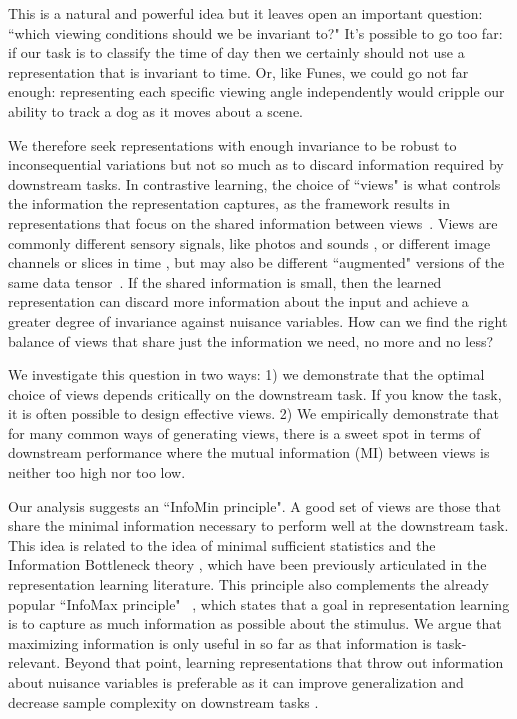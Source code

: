 \documentclass{article}
\begin{document}
This is a natural and powerful idea but it leaves open an important question: ``which viewing conditions should we be invariant to?" It's possible to go too far: if our task is to classify the time of day then we certainly should not use a representation that is invariant to time. Or, like Funes, we could go not far enough: representing each specific viewing angle independently would cripple our ability to track a dog as it moves about a scene. 

We therefore seek representations with enough invariance to be robust to inconsequential variations but not so much as to discard information required by downstream tasks. 
In contrastive learning, the choice of ``views" is what controls the information the representation captures, as the framework results in representations that focus on the shared information between views~\cite{oord2018representation}. Views are commonly different sensory signals, like photos and sounds \cite{arandjelovic2018objects}, or different image channels \cite{tian2019contrastive} or slices in time \cite{tschannen2019self}, but may also be different ``augmented" versions of the same data tensor~\cite{chen2020simple}. If the shared information is small, then the learned representation can discard more information about the input and achieve a greater degree of invariance against nuisance variables. How can we find the right balance of views that share just the information we need, no more and no less?



We investigate this question in two ways: 1) we demonstrate that the optimal choice of views depends critically on the downstream task. If you know the task, it is often possible to design effective views. 2) We empirically demonstrate that for many common ways of generating views, there is a sweet spot in terms of downstream performance where the mutual information (MI) between views is neither too high nor too low.

Our analysis suggests an ``InfoMin principle". A good set of views are those that share the minimal information necessary to perform well at the downstream task. This idea is related to the idea of minimal sufficient statistics \cite{soatto2014visual} and the Information Bottleneck theory \cite{tishby2000information,alemi2016deep}, which have been previously articulated in the representation learning literature. This principle also complements the already popular ``InfoMax principle"~\cite{linsker1988self}
, which states that a goal in representation learning is to capture as much information as possible about the stimulus. We argue that maximizing information is only useful in so far as that information is task-relevant. Beyond that point, learning representations that throw out information about nuisance variables is preferable as it can improve generalization and decrease sample complexity on downstream tasks \cite{soatto2014visual}.
\end{document}
